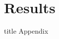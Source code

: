 \documentclass[compress, 8pt]{beamer}
\begin{document}
\section[Results]{Results}





\miniframesoff
\begin{frame}[noframenumbering]
\begin{beamercolorbox}[sep=11pt,center]{title}
    Appendix
\end{beamercolorbox}
\end{frame}
\end{document}
